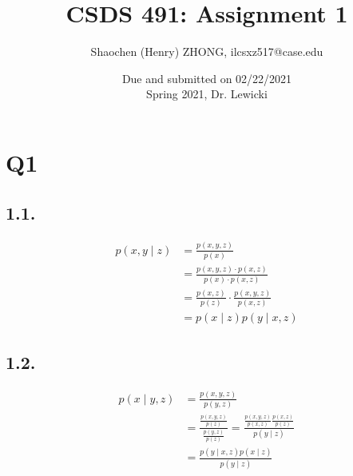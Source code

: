 \documentclass[11pt]{article}
\begin{document}
\title{\textbf{CSDS 491: Assignment 1}}

\author{Shaochen (Henry) ZHONG, ilc{sxz517@case.edu}}

\date{Due and submitted on 02/22/2021 \\ Spring 2021, Dr. Lewicki}
\maketitle


%
%
%
%


\section*{Q1}


\subsection*{1.1.}

\begin{align*}
    p(x, y  \mid  z) &= \frac{p(x, y, z)}{p(x)} \\
    &= \frac{p(x, y, z) \cdot p(x, z)}{p(x) \cdot p(x, z)} \\
    &= \frac{p(x, z)}{p(z)} \cdot \frac{p(x, y, z)}{p(x, z)} \\\
    &= p(x  \mid  z) p(y  \mid  x, z)
\end{align*}

\subsection*{1.2.}


\begin{align*}
    p(x  \mid  y, z) &= \frac{p(x, y, z)}{p(y, z)} \\
    &= \frac{\frac{p(x, y, z)}{p(z)}}{\frac{p(y, z)}{p(z)}} = \frac{\frac{p(x, y, z)}{p(x, z)}\frac{p(x, z)}{p(z)}}{p(y  \mid  z)} \\
    &= \frac{p(y  \mid  x, z) p(x  \mid  z)}{p(y  \mid  z)}
\end{align*}
\end{document}
